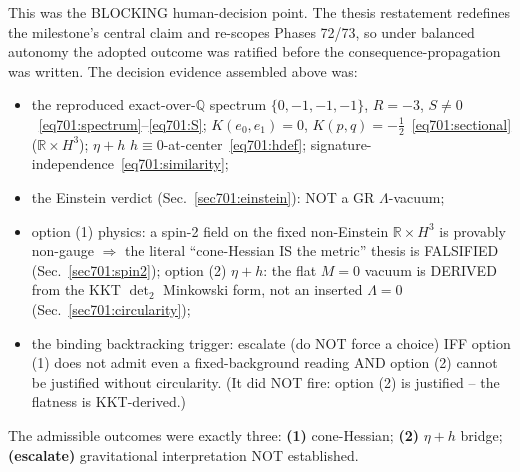 This was the BLOCKING human-decision point. The thesis restatement redefines the
milestone's central claim and re-scopes Phases 72/73, so under balanced autonomy the
adopted outcome was ratified before the consequence-propagation was written. The
decision evidence assembled above was:
\begin{itemize}
  \item the reproduced exact-over-$\mathbb{Q}$ spectrum $\{0,-1,-1,-1\}$, $R=-3$,
        $S\neq0$~\eqref{eq701:spectrum}--\eqref{eq701:S}; $K(e_0,e_1)=0$,
        $K(p,q)=-\tfrac12$~\eqref{eq701:sectional} ($\mathbb{R}\times H^3$); $\eta+h$
        $h\equiv0$-at-center~\eqref{eq701:hdef}; signature-independence~\eqref{eq701:similarity};
  \item the Einstein verdict (Sec.~\ref{sec701:einstein}): NOT a GR $\Lambda$-vacuum;
  \item option (1) physics: a spin-2 field on the fixed non-Einstein
        $\mathbb{R}\times H^3$ is provably non-gauge $\Rightarrow$ the literal
        ``cone-Hessian IS the metric'' thesis is FALSIFIED (Sec.~\ref{sec701:spin2});
        option (2) $\eta+h$: the flat $M=0$ vacuum is DERIVED from the KKT $\det_2$
        Minkowski form, not an inserted $\Lambda=0$ (Sec.~\ref{sec701:circularity});
  \item the binding backtracking trigger: escalate (do NOT force a choice) IFF option (1)
        does not admit even a fixed-background reading AND option (2) cannot be justified
        without circularity. (It did NOT fire: option (2) is justified -- the flatness is
        KKT-derived.)
\end{itemize}
The admissible outcomes were exactly three: \textbf{(1)} cone-Hessian; \textbf{(2)}
$\eta+h$ bridge; \textbf{(escalate)} gravitational interpretation NOT established.

